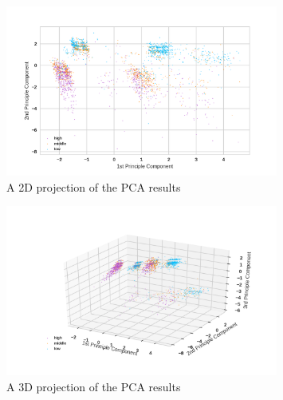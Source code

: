 \documentclass[12pt]{article}
\begin{document}
\begin{figure}[htb]
\centering
\includegraphics[width = 0.8\textwidth]{images/pca1-2d.png}
\caption{A 2D projection of the PCA results}
\label{fig:pca1-2d}
\end{figure}
\begin{figure}[htb]
\centering
\includegraphics[width = 0.8\textwidth]{images/pca1-3d.png}
\caption{A 3D projection of the PCA results}
\label{fig:pca1-3d}
\end{figure}
\end{document}
